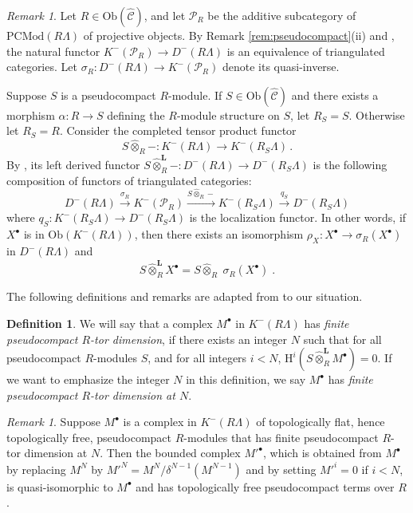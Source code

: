 \documentclass{amsart}
\theoremstyle{plain}
\theoremstyle{definition}
\newtheorem{dfn}[thm]{Definition}
\theoremstyle{remark}
\newtheorem{rem}[thm]{Remark}
\begin{document}
\begin{rem}
\label{rem:leftderivedtensor}
Let $R \in \mathrm{Ob}(\hat{\mathcal{C}})$, and let $\mathcal{P}_R$ be the additive subcategory of 
$\mathrm{PCMod}(R\Lambda)$ of projective objects.
By Remark \ref{rem:pseudocompact}(ii) and \cite[Thm. 10.4.8]{Weibel}, the natural functor 
$K^-(\mathcal{P}_R)\to D^-(R\Lambda)$ is an equivalence of triangulated categories. 
Let $\sigma_R: D^-(R\Lambda)\to K^-(\mathcal{P}_R)$ denote its quasi-inverse.

Suppose $S$ is a pseudocompact $R$-module. If $S\in \mathrm{Ob}(\hat{\mathcal{C}})$ and there
exists a morphism $\alpha:R\to S$ defining the $R$-module structure on $S$, let $R_S=S$.
Otherwise let $R_S=R$. Consider the completed tensor product functor
$$S\hat{\otimes}_R-:K^-(R\Lambda)\to K^-(R_S\Lambda)\,.$$
By \cite[Thm. 10.5.6]{Weibel}, its left derived functor $S\hat{\otimes}^{\mathbf{L}}_R-:
D^-(R\Lambda)\to D^-(R_S\Lambda)$ is the following
composition of functors of triangulated categories:
\begin{equation}
\label{eq:leftderiveddef}
D^-(R\Lambda)\xrightarrow{\sigma_R}K^-(\mathcal{P}_R)\xrightarrow{S\hat{\otimes}_R-}
K^-(R_S\Lambda)\xrightarrow{q_S}D^-(R_S\Lambda)
\end{equation}
where $q_S:K^-(R_S\Lambda)\to D^-(R_S\Lambda)$ is the localization functor.
In other words, if $X^\bullet$ is in $\mathrm{Ob}(K^-(R\Lambda))$, then 
there exists an isomorphism $\rho_X:X^\bullet\to \sigma_R(X^\bullet)$ in $D^-(R\Lambda)$ and
\begin{equation}
\label{eq:leftderived}
S\hat{\otimes}^{\mathbf{L}}_R X^\bullet=S\hat{\otimes}_R\;\sigma_R(X^\bullet)\;.
\end{equation}
\end{rem}

The following definitions and remarks are adapted from \cite[Sect. 2]{bcderived} to our situation.

\begin{dfn}
\label{def:fintor}
We will say that a complex $M^\bullet$ in $K^-(R\Lambda)$
has \emph{finite pseudocompact $R$-tor dimension}, 
if there exists an integer $N$ such that for all pseudocompact
$R$-modules $S$, and for all integers $i<N$, ${\mathrm{H}}^i(S\hat{\otimes}^{\mathbf{L}}_R M^\bullet)=0$.
If we want to emphasize the integer $N$ in this definition, we say $M^\bullet$ has 
\emph{finite pseudocompact $R$-tor dimension at $N$}.
\end{dfn}

\begin{rem}
\label{rem:dumbdumb}
Suppose $M^\bullet$ is a complex in $K^-(R\Lambda)$ of topologically flat, hence topologically free, 
pseudocompact $R$-modules that has finite pseudocompact $R$-tor dimension
at $N$. Then the bounded complex ${M'}^\bullet$, which is
obtained from $M^\bullet$ by replacing $M^N$ by
${M'}^N=M^N/\delta^{N-1}(M^{N-1})$ and by setting ${M'}^i = 0$ if $i < N$,
is quasi-isomorphic to $M^\bullet$ and
has topologically free pseudocompact terms over $R$.
\end{rem}
\end{document}
